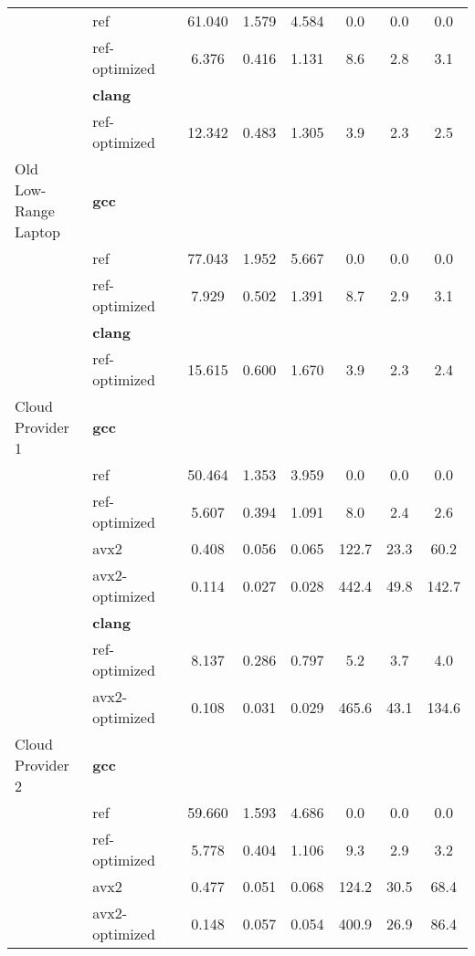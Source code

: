 \begin{table}
\begin{tabularx}{\linewidth}{l l c c c c c c}
          & ref & 61.040 & 1.579 & 4.584 & 0.0 & 0.0 & 0.0\\
          & ref-optimized & 6.376 & 0.416 & 1.131 & 8.6 & 2.8 & 3.1\\
          & \textbf{clang} & & & & & \\
          & ref-optimized & 12.342 & 0.483 & 1.305 & 3.9 & 2.3 & 2.5\\
          \midrule
          \multirowcell{5}{Old\\ Low-Range\\ Laptop}
          & \textbf{gcc} & & & & & \\
          & ref & 77.043 & 1.952 & 5.667 & 0.0 & 0.0 & 0.0\\
          & ref-optimized & 7.929 & 0.502 & 1.391 & 8.7 & 2.9 & 3.1\\
          & \textbf{clang} & & & & & \\
          & ref-optimized & 15.615 & 0.600 & 1.670 & 3.9 & 2.3 & 2.4\\
          \midrule
          \multirowcell{8}{Cloud\\ Provider\\ 1}
          & \textbf{gcc} & & & & & \\
          & ref & 50.464 & 1.353 & 3.959 & 0.0 & 0.0 & 0.0\\
          & ref-optimized & 5.607 & 0.394 & 1.091 & 8.0 & 2.4 & 2.6\\
          & avx2 & 0.408 & 0.056 & 0.065 & 122.7 & 23.3 & 60.2\\
          & avx2-optimized & 0.114 & 0.027 & 0.028 & 442.4 & 49.8 & 142.7\\
          & \textbf{clang} & & & & & \\
          & ref-optimized & 8.137 & 0.286 & 0.797 & 5.2 & 3.7 & 4.0\\
          & avx2-optimized & 0.108 & 0.031 & 0.029 & 465.6 & 43.1 & 134.6\\
          \midrule
          \multirowcell{8}{Cloud\\ Provider\\ 2}
          & \textbf{gcc} & & & & & \\
          & ref & 59.660 & 1.593 & 4.686 & 0.0 & 0.0 & 0.0\\
          & ref-optimized & 5.778 & 0.404 & 1.106 & 9.3 & 2.9 & 3.2\\
          & avx2 & 0.477 & 0.051 & 0.068 & 124.2 & 30.5 & 68.4\\
          & avx2-optimized & 0.148 & 0.057 & 0.054 & 400.9 & 26.9 & 86.4\\

\end{tabularx}
\end{table}
